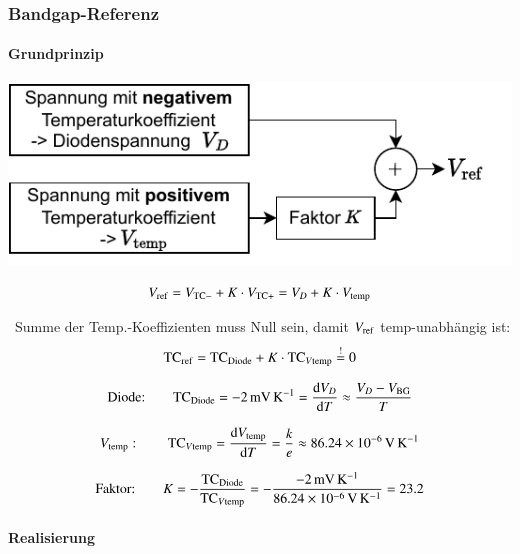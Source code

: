 \subsubsection{Bandgap-Referenz}

\begin{minipage}[c]{0.51\columnwidth}
    \paragraph{Grundprinzip}
    \includegraphics[width=\columnwidth, align=t]{images/13_bandgap_konzept.pdf}
\end{minipage}
\hfill
\begin{minipage}[c]{0.48\columnwidth}

    \[
        V_{\rm ref} = V_{\rm TC-} + K \cdot V_{\rm TC+} = V_D + K \cdot V_{\rm temp}
    \] 

    \textrightarrow\ Summe der Temp.-Koeffizienten muss Null sein, damit $V_{\rm ref}$ temp-unabhängig ist:
    \vspace{-0.2cm}
    \[
        \text{TC}_{\rm ref} = \text{TC}_{\rm Diode} + K \cdot  \text{TC}_{V \rm temp} \overset{!}{=} 0
    \] 
\end{minipage}

\smallskip

\[
    \text{Diode:} \qquad \text{TC}_{\rm Diode} = \qty{-2}{\milli\volt\per\kelvin} = \frac{\mathop{} \! \mathrm{d} V_D}{\mathop{} \! \mathrm{d} T} \approx \frac{V_D-V_{\rm BG}}{T}
\]

\[
    V_{\rm temp}: \qquad \text{TC}_{V \rm temp} = \frac{\mathop{} \! \mathrm{d} V_\mathrm{temp}}{\mathop{} \! \mathrm{d} T} = \frac{k}{e} \approx \qty{86.24e{-6}}{\volt\per\kelvin} 
\]

\[
    \text{Faktor:} \qquad K = -\frac{\text{TC}_{\rm Diode}}{\text{TC}_{V \mathrm{temp}}} = - \frac{\qty{-2}{\milli\volt\per\kelvin}}{\qty{86.24e{-6}}{\volt\per\kelvin}} = 23.2
\]


\paragraph{Realisierung}


